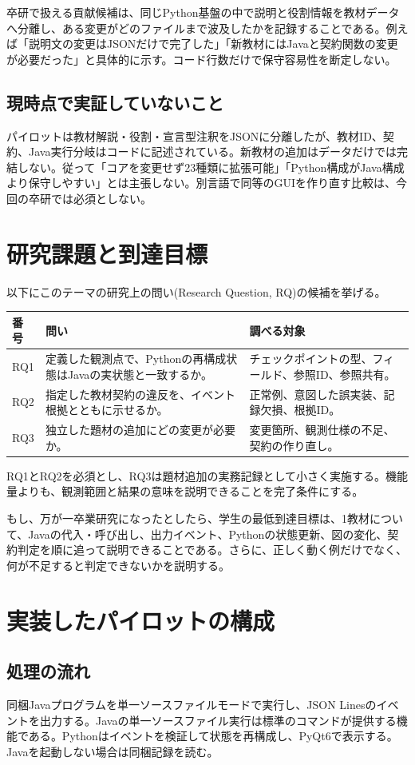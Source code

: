 \documentclass[a4paper,11pt]{ltjsarticle}
\newcommand{\code}[1]{\texttt{\detokenize{#1}}}
\begin{document}
卒研で扱える貢献候補は、同じPython基盤の中で説明と役割情報を教材データへ分離し、ある変更がどのファイルまで波及したかを記録することである。例えば「説明文の変更はJSONだけで完了した」「新教材にはJavaと契約関数の変更が必要だった」と具体的に示す。コード行数だけで保守容易性を断定しない。

\subsection{現時点で実証していないこと}
パイロットは教材解説・役割・宣言型注釈をJSONに分離したが、教材ID、契約、Java実行分岐はコードに記述されている。新教材の追加はデータだけでは完結しない。従って「コアを変更せず23種類に拡張可能」「Python構成がJava構成より保守しやすい」とは主張しない。別言語で同等のGUIを作り直す比較は、今回の卒研では必須としない。
\clearpage


\section{研究課題と到達目標}
以下にこのテーマの研究上の問い(Research Question, RQ)の候補を挙げる。
\begin{longtable}{P{15mm}P{70mm}P{65mm}}
\toprule
番号 & 問い & 調べる対象\\\midrule
\endhead
RQ1 & 定義した観測点で、Pythonの再構成状態はJavaの実状態と一致するか。 & チェックポイントの型、フィールド、参照ID、参照共有。\\
RQ2 & 指定した教材契約の違反を、イベント根拠とともに示せるか。 & 正常例、意図した誤実装、記録欠損、根拠ID。\\
RQ3 & 独立した題材の追加にどの変更が必要か。 & 変更箇所、観測仕様の不足、契約の作り直し。\\
\bottomrule
\end{longtable}
RQ1とRQ2を必須とし、RQ3は題材追加の実務記録として小さく実施する。機能量よりも、観測範囲と結果の意味を説明できることを完了条件にする。

もし、万が一卒業研究になったとしたら、学生の最低到達目標は、1教材について、Javaの代入・呼び出し、出力イベント、Pythonの状態更新、図の変化、契約判定を順に追って説明できることである。さらに、正しく動く例だけでなく、何が不足すると判定できないかを説明する。
\clearpage

\section{実装したパイロットの構成}
\subsection{処理の流れ}
同梱Javaプログラムを単一ソースファイルモードで実行し、JSON Linesのイベントを出力する。Javaの単一ソースファイル実行は標準の\code{java}コマンドが提供する機能である\cite{javacmd}。Pythonはイベントを検証して状態を再構成し、PyQt6で表示する。Javaを起動しない場合は同梱記録を読む。
\end{document}
